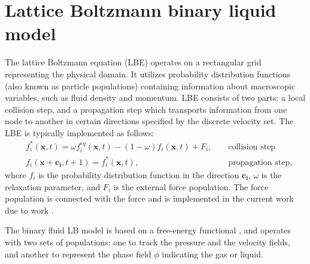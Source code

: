 \documentclass[preprint,12pt]{elsarticle}
\begin{document}
\section{Lattice Boltzmann binary liquid model}
The lattice Boltzmann equation (LBE) operates on a rectangular grid representing the
physical domain. It utilizes
probability distribution functions (also known as particle populations)
containing information about
macroscopic variables, such as fluid density and momentum. LBE consists of
two parts: a local collision step, and a propagation step which transports
information from one node to another in certain
directions specified by the discrete velocity set.
The LBE is typically implemented as follows:
\begin{equation}
\label{standard:implementation}
\begin{aligned}
&f_i^{*}(\bm{x},t)=\omega f_i^{eq}(\bm{x},t)-(1-\omega) f_i(\bm{x},t) +
F_i,&&\text{ collision step}\\
&f_i(\bm{x}+\bm{c_i},t+1)=f_i^{*}(\bm{x},t),&&\text{ propagation step}, 
\end{aligned}
\end{equation}
where $f_i$ is the probability distribution function in the direction $\bm{c_i}$, $\omega$ is the
relaxation parameter, and $F_i$ is the external force population.{\color{red} The force population
is connected with the force and is implemented in the current work due to work \cite{guo}.} 

The binary fluid LB model is
based on a free-energy functional \cite{swift,landau}, and operates with two
sets of populations: one to track the pressure and the velocity fields, and another to represent the
phase field $\phi$ indicating the gas or liquid.
\end{document}
